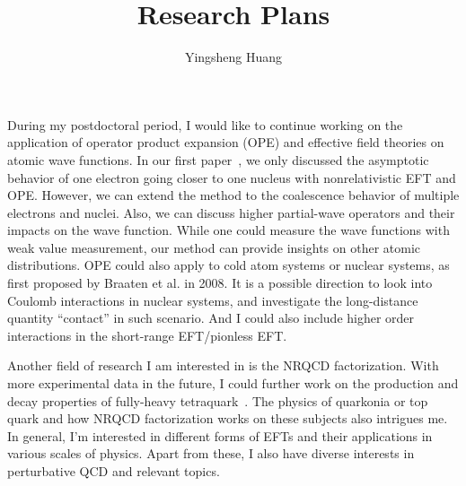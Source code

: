 \documentclass[letterpaper,11pt]{article}
\title{Research Plans}
\author{Yingsheng Huang}
\date{}
\begin{document}
\maketitle

During my postdoctoral period, I would like to continue working on the application of operator product expansion (OPE) and effective field theories on atomic wave functions. In our first paper~\cite{Huang2018}, we only discussed the asymptotic behavior of one electron going closer to one nucleus with nonrelativistic EFT and OPE. However, we can extend the method to the coalescence behavior of multiple electrons and nuclei. Also, we can discuss higher partial-wave operators and their impacts on the wave function. While one could measure the wave functions with weak value measurement, our method can provide insights on other atomic distributions.
OPE could also apply to cold atom systems or nuclear systems, as first proposed by Braaten et al. in 2008. It is a possible direction to look into Coulomb interactions in nuclear systems, and investigate the long-distance quantity ``contact'' in such scenario. And I could also include higher order interactions in the short-range EFT/pionless EFT.

Another field of research I am interested in is the NRQCD factorization. With more experimental data in the future, I could further work on the production and decay properties of fully-heavy tetraquark~\cite{Feng2020,Feng2020a}. The physics of quarkonia or top quark and how NRQCD factorization works on these subjects also intrigues me. In general, I'm interested in different forms of EFTs and their applications in various scales of physics. Apart from these, I also have diverse interests in perturbative QCD and relevant topics. 



\end{document}
